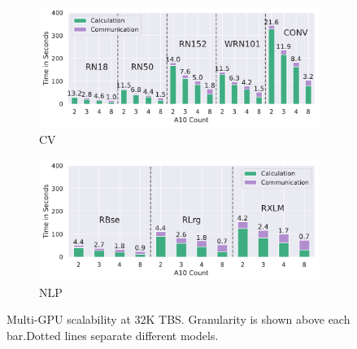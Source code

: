 \begin{figure}
    \begin{subfigure}[c]{0.23\textwidth}
        \includegraphics[width=\textwidth]{figures/misc/cv_full-a10_all-tbs_granularity}
        \vspace{-18pt}
        \caption{CV} 
        \label{fig:cv-multi-a10-granularity}
    \end{subfigure}
    \begin{subfigure}[c]{0.23\textwidth}
        \includegraphics[width=\textwidth]{figures/misc/nlp_full-a10_all-tbs_granularity}
        \vspace{-18pt}
        \caption{NLP}
        \label{fig:nlp-multi-a10-granularity}
    \end{subfigure} 
    \vspace{-10pt} 
    \caption{Multi-GPU scalability at 32K TBS. Granularity is shown above each bar.Dotted lines separate different models.}
    \label{fig:multi-a10-granulartiy}
    \vspace*{-4mm}
\end{figure}  

